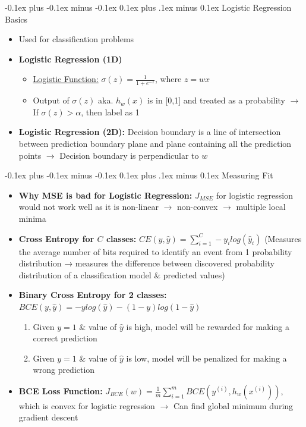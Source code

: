 \documentclass[landscape]{article}
\makeatletter
\renewcommand{\subsection}{\@startsection{subsection}{2}{0mm}%
  {-0.1ex plus -0.1ex minus -0.1ex}%
  {0.1ex plus .1ex minus 0.1ex}%
{\normalfont\scriptsize\bfseries}}
\makeatother
\begin{document}
\begin{multicols*}{5}
        \subsection{Logistic Regression Basics}
        \begin{itemize}
          \item Used for classification problems 
          \item \textbf{Logistic Regression (1D)}
          \begin{itemize}
            \item \underline{Logistic Function:} $\sigma(z) = \frac{1}{1 + e^{-z}}$, where $z = wx$
            \item Output of $\sigma(z)$ aka. $h_w(x)$ is in [0,1] and treated as a probability $\rightarrow$ If $\sigma(z)>\alpha$, then label as 1
          \end{itemize}
          \item \textbf{Logistic Regression (2D):} Decision boundary is a line of intersection between prediction boundary plane and plane containing all the prediction points $\rightarrow$ Decision boundary is perpendicular to $w$
        \end{itemize}

        \subsection{Measuring Fit}
        \begin{itemize}
          \item \textbf{Why MSE is bad for Logistic Regression:} $J_{MSE}$ for logistic regression would not work well as it is non-linear $\rightarrow$ non-convex $\rightarrow$ multiple local minima
          \item \textbf{Cross Entropy for $C$ classes:} $CE(y, \hat{y}) = \sum_{i=1}^C -y_ilog(\hat{y}_i)$ (Measures the average number of bits required to identify an event from 1 probability distribution → measures the difference between discovered probability distribution of a classification model \& predicted values)
          \item \textbf{Binary Cross Entropy for 2 classes:} $BCE(y, \hat{y}) = -ylog(\hat{y}) -(1-y)log(1-\hat{y})$
          \begin{enumerate}
            \item Given $y=1$ \& value of $\hat{y}$ is high, model will be rewarded for making a correct prediction
            \item Given $y=1$ \& value of $\hat{y}$ is low, model will be penalized for making a wrong prediction
          \end{enumerate}
          \item \textbf{BCE Loss Function:} $J_{BCE}(w) = \frac{1}{m}\sum^m_{i=1}BCE(y^{(i)}, h_w(x^{(i)}))$, which is convex for logistic regression $\rightarrow$ Can find global minimum during gradient descent
        \end{itemize}


\end{multicols*}
\end{document}
